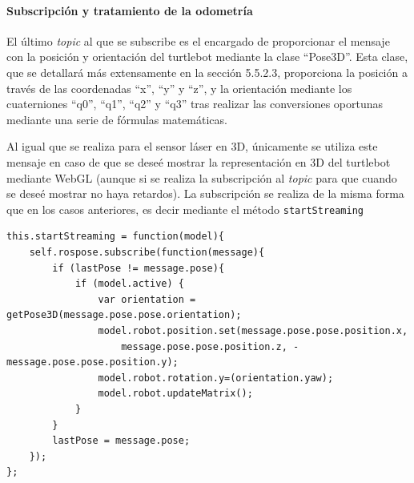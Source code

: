 \paragraph{Subscripción y tratamiento de la odometría}

El último \textit{topic} al que se subscribe es el encargado de proporcionar el mensaje con la posición y orientación del turtlebot mediante la clase ``Pose3D''. Esta clase, que se detallará más extensamente en la sección 5.5.2.3, proporciona la posición a través de las coordenadas ``x'', ``y'' y ``z'', y la orientación mediante los cuaterniones ``q0'', ``q1'', ``q2'' y ``q3'' tras realizar las conversiones oportunas mediante una serie de fórmulas matemáticas.

Al igual que se realiza para el sensor láser en 3D, únicamente se utiliza este mensaje en caso de que se deseé mostrar la representación en 3D del turtlebot mediante WebGL (aunque si se realiza la subscripción al \textit{topic} para que cuando se deseé mostrar no haya retardos). La subscripción se realiza de la misma forma que en los casos anteriores, es decir mediante el método \texttt{startStreaming}

\begin{lstlisting}[caption= Subscripción y tratamiento del mensaje para obtener la posición, label=cod.pose3d]
this.startStreaming = function(model){
	self.rospose.subscribe(function(message){
		if (lastPose != message.pose){
			if (model.active) {
				var orientation = getPose3D(message.pose.pose.orientation);
				model.robot.position.set(message.pose.pose.position.x, 
					message.pose.pose.position.z, -message.pose.pose.position.y);
				model.robot.rotation.y=(orientation.yaw);
				model.robot.updateMatrix();
			}
		}
		lastPose = message.pose;
	});
};
\end{lstlisting}

